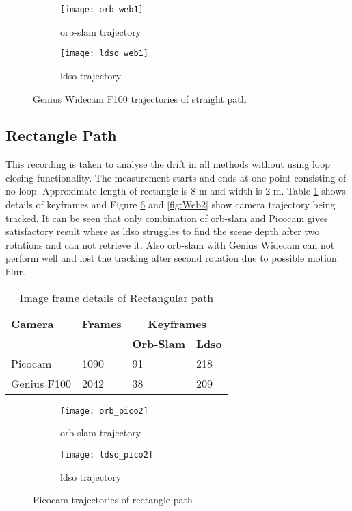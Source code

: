 \begin{figure}[H]
	\begin{subfigure}{.5\textwidth}
		\centering
		\texttt{[image: orb\_web1]}
		\caption{\acrshort{orb}-\acrshort{slam} trajectory}
		\label{fig:orb_web1}
	\end{subfigure}%
	\begin{subfigure}{.5\textwidth}
		\centering
		\texttt{[image: ldso\_web1]}
		\caption{\acrshort{ldso} trajectory}
		\label{fig:ldso_web1}
	\end{subfigure}
	\caption{Genius Widecam F100 trajectories of straight path}
	\label{fig:Web1}
\end{figure}

\subsection{Rectangle Path}
This recording is taken to analyse the drift in all methods without using loop closing functionality. The measurement starts and ends at one point consisting of no loop. Approximate length of rectangle is 8 m and width is 2 m. Table \ref{table:rectangle} shows details of keyframes and Figure \ref{fig:Pico2} and \ref{fig:Web2} show camera trajectory being tracked. It can be seen that only combination of \acrshort{orb}-\acrshort{slam} and Picocam gives satisfactory result where as \acrshort{ldso}  struggles to find the scene depth after two rotations and can not retrieve it. Also \acrshort{orb}-\acrshort{slam} with Genius Widecam can not perform well and lost the tracking after second rotation due to possible motion blur.
\begin{table}[H]
	\centering
	\renewcommand{\arraystretch}{1.5}
	\begin{tabular}{ l| l| l |l }
		\textbf{Camera} & \textbf{Frames} & \multicolumn{2}{c}{\textbf{Keyframes}}  \\    
		&      & \textbf{Orb-Slam}  & \textbf{Ldso}  \\
		\hline
		Picocam & 1090 &  91  & 218 \\ 
		\hline
		Genius F100 & 2042 &  38  & 209 \\ 
	\end{tabular}
	\caption{Image frame details of Rectangular path}
	\label{table:rectangle}
\end{table}
\begin{figure}[H]
	\begin{subfigure}{.6\textwidth}
		\centering
		\texttt{[image: orb\_pico2]}
		\caption{\acrshort{orb}-\acrshort{slam} trajectory}
		\label{fig:orb_pico2}
	\end{subfigure}
	\begin{subfigure}{.4\textwidth}
		\centering
		\texttt{[image: ldso\_pico2]}
		\caption{\acrshort{ldso} trajectory}
		\label{fig:ldso_pico2}
	\end{subfigure}
	\caption{Picocam trajectories of rectangle path}
	\label{fig:Pico2}
\end{figure}
